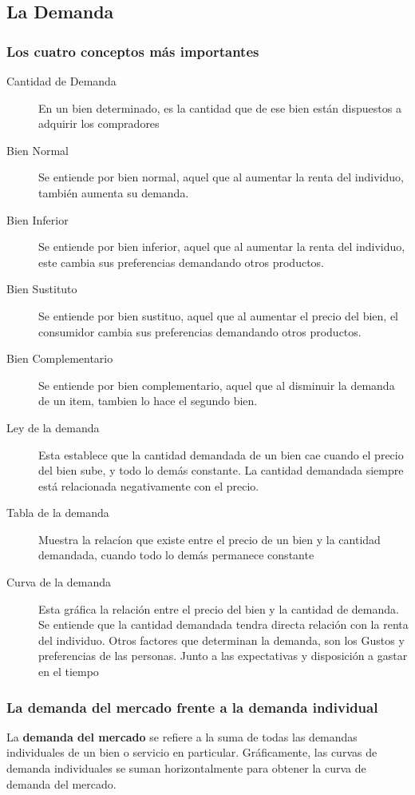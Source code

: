 \subsection{La Demanda}
\subsubsection{Los cuatro conceptos más importantes}
\begin{description}
\item[Cantidad de Demanda] En un bien determinado, es la cantidad que de ese bien están dispuestos a adquirir los compradores
\item[Bien Normal] Se entiende por bien normal, aquel que al aumentar la renta del individuo, también aumenta su demanda.
\item[Bien Inferior] Se entiende por bien inferior, aquel que al aumentar la renta del individuo, este cambia sus preferencias demandando otros productos.
\item[Bien Sustituto] Se entiende por bien sustituo, aquel que al aumentar el precio del bien, el consumidor cambia sus preferencias demandando otros productos.
\item[Bien Complementario] Se entiende por bien complementario, aquel que al disminuir la demanda de un item, tambien lo hace el segundo bien.
\item[Ley de la demanda] Esta establece que la cantidad demandada de un bien cae cuando el precio del bien sube, y todo lo demás constante. La cantidad demandada siempre está relacionada negativamente con el precio. 
\item[Tabla de la demanda] Muestra la relacíon que existe entre el precio de un bien y la cantidad demandada, cuando todo lo demás permanece constante
\item[Curva de la demanda] Esta gráfica la relación entre el precio del bien y la cantidad de demanda. Se entiende que la cantidad demandada tendra directa relación con la renta del individuo. Otros factores que determinan la demanda, son los Gustos y preferencias de las personas. Junto a las expectativas y disposición a gastar en el tiempo
\end{description}

\subsubsection{La demanda del mercado frente a la demanda individual}
La {\bf demanda del mercado} se refiere a la suma de todas las demandas individuales de un bien o servicio en particular. Gráficamente, las curvas de demanda individuales se suman horizontalmente para obtener la curva de demanda del mercado.


